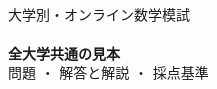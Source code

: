 %
%
%

\usepackage[unicode,hidelinks]{hyperref}


\renewcommand{\seriesname}{\MoshiTitle}
\renewcommand{\booktitle}{共通見本}
\renewcommand{\bookyear}{\MoshiYear}



\thispagestyle{empty}
\null\vspace*{18mm}
\bindmarks
\begin{center}
  {\footnotesize \MoshiSeason}\\[3.5mm]
  {\footnotesize 大学別・オンライン数学模試}\\[3mm]
  {\fontsize{26}{32}\selectfont\bfseries \MoshiTitle}\\[6mm]
  {\fontsize{18}{24}\selectfont\bfseries 全大学共通の見本}\\[6mm]
  {\normalsize 問題 ・ 解答と解説 ・ 採点基準}\\[14mm]
  {\footnotesize\bdotrow}
\end{center}

